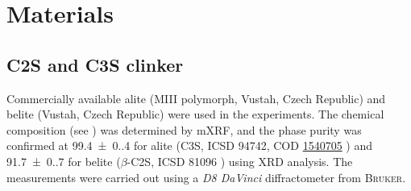 \FloatBarrier
\section{Materials}
\label{sec:materials}

\subsection{\acs{C2S} and \acs{C3S} clinker}

Commercially available alite (MIII polymorph, Vustah, Czech Republic) and belite (Vustah, Czech Republic) were used in the experiments.
The chemical composition (see ) was determined by \ac{mXRF}, and the phase purity was confirmed at \qty{99.4(0.4)}{\wtpercent} for alite (\ac{C3S}, \acs{ICSD} 94742, \acs{COD} \href{https://qiserver.ugr.es/cod/1540705.html}{1540705} \cite{delatorre.2002}) and \qty{91.7(0.7)}{\wtpercent} for belite ($\beta$-\ac{C2S}, \acs{ICSD} 81096 \cite{jost.1977}) using \ac{XRD} analysis.
The measurements were carried out using a \textit{D8 DaVinci} diffractometer from \textsc{Bruker}.


